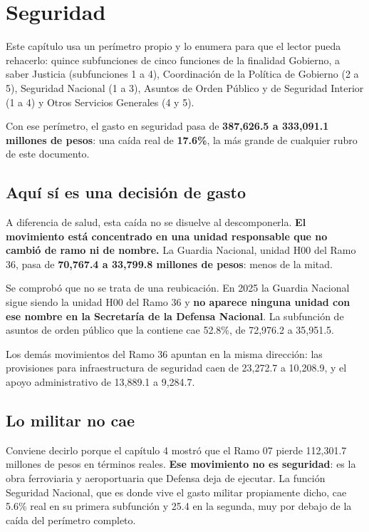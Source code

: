 \chapter{Seguridad}

Este capítulo usa un perímetro propio y lo enumera para que el lector pueda
rehacerlo: quince subfunciones de cinco funciones de la finalidad Gobierno, a
saber Justicia (subfunciones 1 a 4), Coordinación de la Política de Gobierno (2 a
5), Seguridad Nacional (1 a 3), Asuntos de Orden Público y de Seguridad Interior
(1 a 4) y Otros Servicios Generales (4 y 5).

Con ese perímetro, el gasto en seguridad pasa de \textbf{387,626.5 a 333,091.1
millones de pesos}: una caída real de \textbf{17.6\%}, la más grande de cualquier
rubro de este documento.



\section{Aquí sí es una decisión de gasto}

A diferencia de salud, esta caída no se disuelve al descomponerla.
\textbf{El movimiento está concentrado en una unidad responsable que no cambió de
ramo ni de nombre.} La Guardia Nacional, unidad H00 del Ramo 36, pasa de
\textbf{70,767.4 a 33,799.8 millones de pesos}: menos de la mitad.

Se comprobó que no se trata de una reubicación. En 2025 la Guardia Nacional sigue
siendo la unidad H00 del Ramo 36 y \textbf{no aparece ninguna unidad con ese
nombre en la Secretaría de la Defensa Nacional}. La subfunción de asuntos de orden
público que la contiene cae 52.8\%, de 72,976.2 a 35,951.5.

Los demás movimientos del Ramo 36 apuntan en la misma dirección: las provisiones
para infraestructura de seguridad caen de 23,272.7 a 10,208.9, y el apoyo
administrativo de 13,889.1 a 9,284.7.

\section{Lo militar no cae}

Conviene decirlo porque el capítulo 4 mostró que el Ramo 07 pierde 112,301.7
millones de pesos en términos reales. \textbf{Ese movimiento no es seguridad}: es
la obra ferroviaria y aeroportuaria que Defensa deja de ejecutar. La función
Seguridad Nacional, que es donde vive el gasto militar propiamente dicho, cae
5.6\% real en su primera subfunción y 25.4 en la segunda, muy por debajo de la
caída del perímetro completo.

